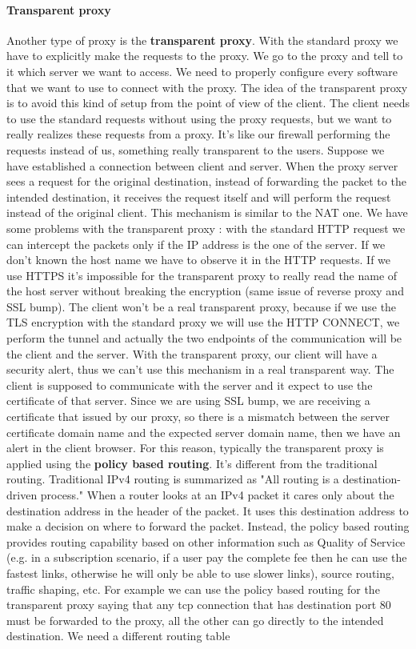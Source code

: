 \documentclass[11pt]{article}
\begin{document}
\paragraph{Transparent proxy} Another type of proxy is the \textbf{transparent proxy}. With the standard proxy we have to explicitly make the requests to the proxy. We go to the proxy and tell to it which server we want to access. We need to properly configure every software that we want to use to connect with the proxy. The idea of the transparent proxy is to avoid this kind of setup from the point of view of the client. The client needs to use the standard requests without using the proxy requests, but we want to really realizes these requests from a proxy. It's like our firewall performing the requests instead of us, something really transparent to the users. Suppose we have established a connection between client and server. When the proxy server sees a request for the original destination, instead of forwarding the packet to the intended destination, it receives the request itself and will perform the request instead of the original client. This mechanism is similar to the NAT one. We have some problems with the transparent proxy : with the standard HTTP request we can intercept the packets only if the IP address is the one of the server. If we don't known the host name we have to observe it in the HTTP requests. If we use HTTPS it's impossible for the transparent proxy to really read the name of the host server without breaking the encryption (same issue of reverse proxy and SSL bump). The client won't be a real transparent proxy, because if we use the TLS encryption with the standard proxy we will use the HTTP CONNECT, we perform the tunnel and actually the two endpoints of the communication will be the client and the server. With the transparent proxy, our client will have a security alert, thus we can't use this mechanism in a real transparent way. The client is supposed to communicate with the server and it expect to use the certificate of that server. Since we are using SSL bump, we are receiving a certificate that issued by our proxy, so there is a mismatch between the server certificate domain name and the expected server domain name, then we have an alert in the client browser. For this reason, typically the transparent proxy is applied using the \textbf{policy based routing}. It's different from the traditional routing. Traditional IPv4 routing is summarized as "All routing is a destination-driven process." When a router looks at an IPv4 packet it cares only about the destination address in the header of the packet. It uses this destination address to make a decision on where to forward the packet. Instead, the policy based routing provides routing capability based on other information such as Quality of Service (e.g. in a subscription scenario, if a user pay the complete fee then he can use the fastest links, otherwise he will only be able to use slower links), source routing, traffic shaping, etc. For example we can use the policy based routing for the transparent proxy saying that any tcp connection that has destination port 80 must be forwarded to the proxy, all the other can go directly to the intended destination. We need a different routing table 
\end{document}
